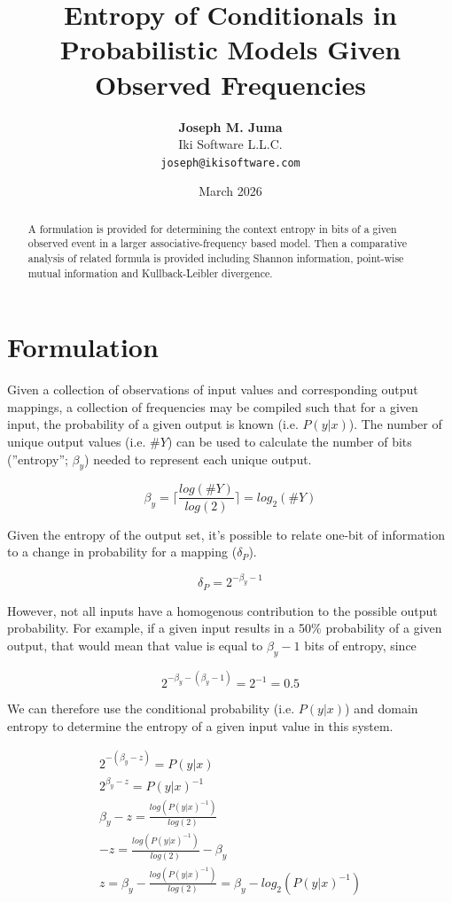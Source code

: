 \documentclass{article}
\title{Entropy of Conditionals in Probabilistic Models Given Observed Frequencies}
\author{
    \textbf{Joseph M. Juma} \\
    Iki Software L.L.C. \\
    \texttt{joseph@ikisoftware.com}
}
\date{March 2026}
\newcounter{para}
\begin{document}
\maketitle

\begin{abstract}
    \noindent
    A formulation is provided for determining the context entropy in bits of a given observed event in a larger associative-frequency based model. Then a comparative analysis of related formula is provided including Shannon information, point-wise mutual information and Kullback-Leibler divergence.
\end{abstract}

\section{Formulation}
Given a collection of observations of input values and corresponding output mappings, a collection of frequencies may be compiled such that for a given input, the probability of a given output is known (i.e. $P(y|x)$). The number of unique output values (i.e. $\#Y$) can be used to calculate the number of bits (”entropy”; $\beta_{y}$) needed to represent each unique output.

\begin{equation}
\beta_{y} = \lceil \frac{log(\#Y)}{log(2)} \rceil = log_2(\#Y)
\end{equation}

Given the entropy of the output set, it’s possible to relate one-bit of information to a change in probability for a mapping ($\delta_{P}$).

\begin{equation}
\delta_{P} = 2^{-\beta_{y} - 1}
\end{equation}

However, not all inputs have a homogenous contribution to the possible output probability. For example, if a given input results in a 50\% probability of a given output, that would mean that value is equal to $\beta_{y} - 1$ bits of entropy, since

\begin{equation}
2^{-\beta_{y} - (\beta_{y} - 1)} = 2^{-1} = 0.5
\end{equation}

We can therefore use the conditional probability (i.e. $P(y|x)$) and domain entropy to determine the entropy of a given input value in this system.

\begin{equation}
\begin{gathered}
2^{-(\beta_{y} - z)} = P(y|x) \\
2^{\beta_{y} - z} = P(y|x)^{-1}\\
\beta_{y} - z= \frac{log(P(y|x)^{-1})}{log(2)}\\
-z = \frac{log(P(y|x)^{-1})}{log(2)} - \beta_{y}\\
z = \beta_{y} - \frac{log(P(y|x)^{-1})}{log(2)} = \beta_{y} - log_2(P(y|x)^{-1})
\end{gathered}
\end{equation}
\end{document}
